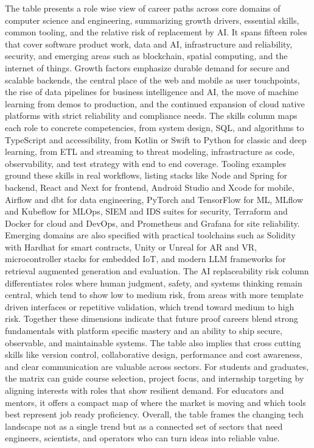 \documentclass[final,5p,times,twocolumn]{elsarticle}
\begin{document}
\begin{table*}
\bigskip
\noindent\begin{minipage}{\textwidth}
\footnotesize
The table presents a role wise view of career paths across core domains of computer science and engineering, summarizing growth drivers, essential skills, common tooling, and the relative risk of replacement by AI. It spans fifteen roles that cover software product work, data and AI, infrastructure and reliability, security, and emerging areas such as blockchain, spatial computing, and the internet of things. Growth factors emphasize durable demand for secure and scalable backends, the central place of the web and mobile as user touchpoints, the rise of data pipelines for business intelligence and AI, the move of machine learning from demos to production, and the continued expansion of cloud native platforms with strict reliability and compliance needs. The skills column maps each role to concrete competencies, from system design, SQL, and algorithms to TypeScript and accessibility, from Kotlin or Swift to Python for classic and deep learning, from ETL and streaming to threat modeling, infrastructure as code, observability, and test strategy with end to end coverage. Tooling examples ground these skills in real workflows, listing stacks like Node and Spring for backend, React and Next for frontend, Android Studio and Xcode for mobile, Airflow and dbt for data engineering, PyTorch and TensorFlow for ML, MLflow and Kubeflow for MLOps, SIEM and IDS suites for security, Terraform and Docker for cloud and DevOps, and Prometheus and Grafana for site reliability. Emerging domains are also specified with practical toolchains such as Solidity with Hardhat for smart contracts, Unity or Unreal for AR and VR, microcontroller stacks for embedded IoT, and modern LLM frameworks for retrieval augmented generation and evaluation. The AI replaceability risk column differentiates roles where human judgment, safety, and systems thinking remain central, which tend to show low to medium risk, from areas with more template driven interfaces or repetitive validation, which trend toward medium to high risk. Together these dimensions indicate that future proof careers blend strong fundamentals with platform specific mastery and an ability to ship secure, observable, and maintainable systems. The table also implies that cross cutting skills like version control, collaborative design, performance and cost awareness, and clear communication are valuable across sectors. For students and graduates, the matrix can guide course selection, project focus, and internship targeting by aligning interests with roles that show resilient demand. For educators and mentors, it offers a compact map of where the market is moving and which tools best represent job ready proficiency. Overall, the table frames the changing tech landscape not as a single trend but as a connected set of sectors that need engineers, scientists, and operators who can turn ideas into reliable value.
\end{minipage}
\end{table*} 
\end{document}
